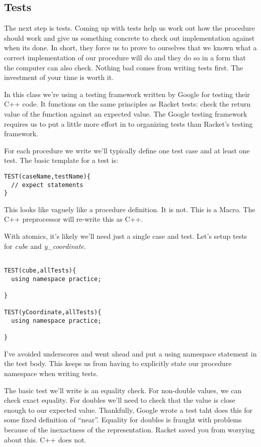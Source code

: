 \documentclass[]{tufte-handout}
\begin{document}
\subsection{Tests}

The next step is tests. Coming up with tests help us work out how the procedure should work and give us something concrete to check out implementation against when its done. In short, they force us to prove to ourselves that we known what a correct implementation of our procedure will do and they do so in a form that the computer can also check. Nothing bad comes from writing tests first. The investment of your time is worth it.    

In this class we're using a testing framework written by Google for testing their C++ code. It functions on the same principles as Racket tests: check the return value of the function against an expected value. The Google testing framework requires us to put a little more effort in to organizing tests than Racket's testing framework. 

For each procedure we write we'll typically define one test case and at least one test. The basic template for a test is:
\begin{verbatim}
TEST(caseName,testName){
  // expect statements
}
\end{verbatim} 
This looks like vaguely like a procedure definition. It is not. This is a Macro. The C++ preprocessor will re-write this as C++.


With atomics, it's likely we'll need just a single case and test.  Let's setup tests for \textit{cube} and \textit{y\_coordinate}.
\begin{verbatim}

TEST(cube,allTests){
  using namespace practice;

}

TEST(yCoordinate,allTests){
  using namespace practice;

}
\end{verbatim}
I've avoided underscores and went ahead and put a using namespace statement in the test body. This keeps us from having to explicitly state our procedure namespace when writing tests. 


The basic test we'll write is an equality check. For non-double values, we can check exact equality. For doubles we'll need to check that the value is close enough to our expected value. Thankfully, Google wrote a test taht does this for some fixed definition of ``near''. Equality for doubles is fraught with problems because of the inexactness of the representation. Racket saved you from worrying about this. C++ does not. 
\end{document}
